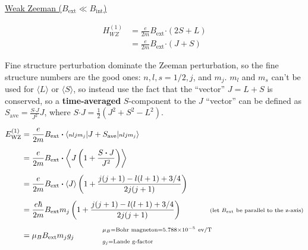 \documentclass[12pt]{article}
\newcommand{\dotP}{\boldsymbol \cdot}		%
\begin{document}
\vspace{5pt} \noindent
\underline{Weak Zeeman (\(B_\text{ext} \ll B_\text{int}\))}

\vspace{-10pt}
\begin{align*}
    H_{WZ}^{(1)} &= \frac{e}{2m} B_\text{ext} \dotP (2S + L)  \\[5pt]
    &= \frac{e}{2m} B_\text{ext} \dotP ( J + S )
\end{align*}

\vspace{5pt}\noindent
Fine structure perturbation dominate the Zeeman perturbation, so the fine structure numbers are the good ones: %
\(n,l,s{\scriptstyle=1/2},j\), and \(m_j\). \(m_l\) and \(m_s\) can't be used for \(\langle L \rangle\) or %
\(\langle S \rangle\), so instead use the fact that %
the ``vector'' \(J = L+S\) is conserved, so a \textbf{time-averaged} \(S\)-component to the \(J\) ``vector'' can be defined as %
\(S_\text{ave} = \frac{S \dotP J}{J^2} J\), where \(S \dotP J = \frac{1}{2} \left( J^2 + S^2 - L^2 \right)\).

\vspace{-10pt}
\begin{align*}
    E^{(1)}_\text{WZ} &= \frac{e}{2m} B_\text{ext} \dotP 
        \langle {\scriptstyle nljm_j} | J + S_\text{ave} | {\scriptstyle nljm_j}\rangle\\[5pt]
    &= \frac{e}{2m} B_\text{ext} \dotP 
        \left\langle J \left( 1 + \frac{S \dotP J}{J^2} \right) \right\rangle\\[5pt]
    &= \frac{e}{2m} B_\text{ext} \dotP \langle J \rangle 
        \left(1 + \frac{ j(j+1) - l(l+1) + 3/4 }{ 2 j (j+1) }\right)\\[5pt]
    &= \frac{e\hbar}{2m} B_\text{ext} m_j
        \left(1 + \frac{ j(j+1) - l(l+1) + 3/4 }{ 2 j (j+1) }\right)
        \hspace{18pt} \hspace{18pt} \text{\scriptsize(let \(B_\text{ext}\) be parallel to the z-axis)}\\[5pt]
    &= \mu_B B_\text{ext} m_j g_j \hspace{18pt} \hspace{18pt} \begin{aligned}
            &{\scriptstyle \mu_B = \text{Bohr magneton} = 5.788 \times 10^{-5} \ \text{ev/T}}\\
            &{\scriptstyle g_j = \text{Lande g-factor}}\\
        \end{aligned}
\end{align*}
\end{document}
